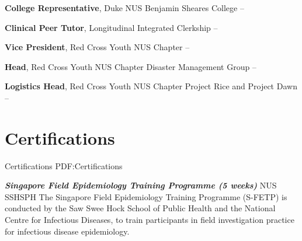 \documentclass[letterpaper,10pt,oneside]{article}
\begin{document}
\begin{body}
\textbf{College Representative}, Duke NUS Benjamin Sheares College
\hfill
{} --  
\GapNoBreak

\textbf{Clinical Peer Tutor}, Longitudinal Integrated Clerkship
\hfill
{} --  
\GapNoBreak

\textbf{Vice President}, Red Cross Youth NUS Chapter
\hfill
{} --  
\GapNoBreak

\textbf{Head}, Red Cross Youth NUS Chapter Disaster Management Group
\hfill
{} --  
\GapNoBreak

\textbf{Logistics Head}, Red Cross Youth NUS Chapter Project Rice and Project Dawn
\hfill
{} --  
\GapNoBreak





\section
{Certifications}
{Certifications}
{PDF:Certifications}

\textbf{\textit{Singapore Field Epidemiology Training Programme (5 weeks)}} NUS SSHSPH 
\hfill
{}
\BulletItem
The Singapore Field Epidemiology Training Programme (S-FETP) is conducted by the Saw Swee Hock School of Public Health and the National Centre for Infectious Diseases, to train participants in field investigation practice for infectious disease epidemiology.


\end{body}
\end{document}
